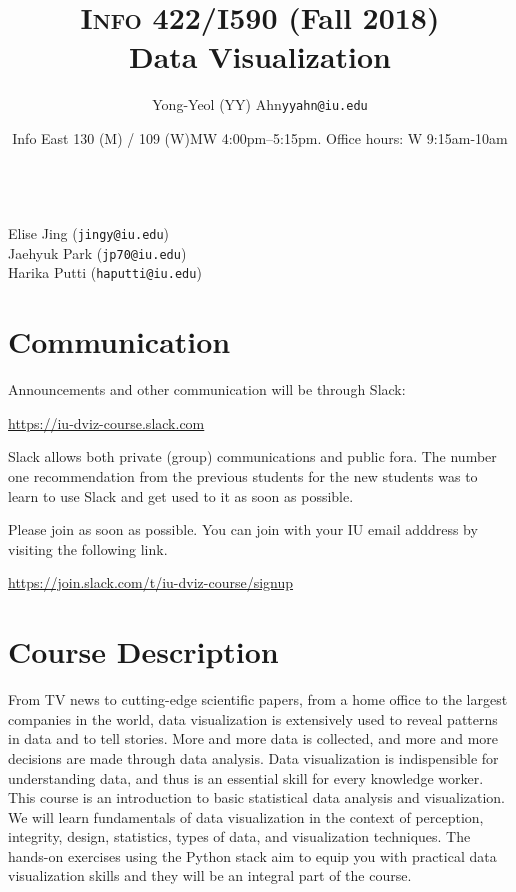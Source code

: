\documentclass[11pt,article,oneside]{memoir} %
\makeatletter
\def\myauthor{Author}
\def\mytitle{Title}
\def\myemail{yyahn@iu.edu}
\def\myauthor{Yong-Yeol (YY) Ahn}
\def\mytitle{{\normalsize \textsc{Info} 422/I590 (Fall 2018)} \\ \HUGE Data Visualization}
\makeatother
\begin{document}

\title{\LARGE \mytitle} %
\author{\Large\myauthor\newline \footnotesize\texttt{\noindent\myemail}}
\date{Info East 130 (M) / 109 (W)\newline MW 4:00pm--5:15pm. \newline Office hours: W 9:15am-10am}

\maketitle 

\vspace{-20pt}{\bfseries Assistant Instructors} \\ 
Elise Jing (\texttt{jingy@iu.edu}) \\
Jaehyuk Park (\texttt{jp70@iu.edu}) \\
Harika Putti (\texttt{haputti@iu.edu})
\section{Communication} %

Announcements and other communication will be through Slack: 

\url{https://iu-dviz-course.slack.com}

Slack allows both private (group) communications and public fora. The number one recommendation from the previous students for the new students was to learn to use Slack and get used to it as soon as possible.  

Please join as soon as possible. You can join with your IU email adddress by visiting the following link. 

\url{https://join.slack.com/t/iu-dviz-course/signup}

\section{Course Description}%

From TV news to cutting-edge scientific papers, from a home office to the largest companies in the world, data visualization is extensively used to reveal patterns in data and to tell stories. 
More and more data is collected, and more and more decisions are made through data analysis. 
Data visualization is indispensible for understanding data, and thus is an essential skill for every knowledge worker.  
This course is an introduction to basic statistical data analysis and visualization.  
We will learn fundamentals of data visualization in the context of perception, integrity, design, statistics, types of data, and visualization techniques.  
The hands-on exercises using the Python stack aim to equip you with practical data visualization skills and they will be an integral part of the course. 
\end{document}
